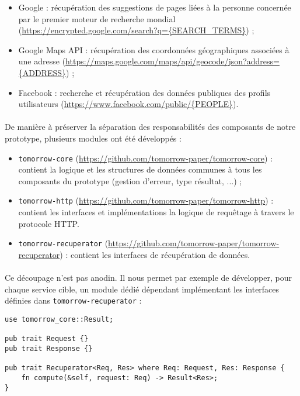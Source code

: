 \begin{itemize}
    \item Google : récupération des suggestions de pages liées à la personne concernée par le
    premier moteur de recherche mondial (\url{https://encrypted.google.com/search?q={SEARCH_TERMS}}) ;
    \item Google Maps API : récupération des coordonnées géographiques associées à une adresse
    (\url{https://maps.google.com/maps/api/geocode/json?address={ADDRESS}}) ;
    \item Facebook : recherche et récupération des données publiques des profils utilisateurs
    (\url{https://www.facebook.com/public/{PEOPLE}}).
\end{itemize}

\paragraph{} De manière à préserver la séparation des responsabilités des composants de notre prototype, plusieurs modules
ont été développés : 

\begin{itemize}
    \item \lstinline{tomorrow-core} (\url{https://github.com/tomorrow-paper/tomorrow-core}) : contient la logique et les
    structures de données communes à tous les composants du prototype (gestion d'erreur, type résultat, ...) ;
    \item \lstinline{tomorrow-http} (\url{https://github.com/tomorrow-paper/tomorrow-http}) : contient les interfaces et
    implémentations la logique de requêtage à travers le protocole HTTP.
    \item \lstinline{tomorrow-recuperator} (\url{https://github.com/tomorrow-paper/tomorrow-recuperator}) : contient les interfaces
    de récupération de données.
\end{itemize}

\paragraph{} Ce découpage n'est pas anodin. Il nous permet par exemple de développer, pour chaque service cible, un module
dédié dépendant implémentant les interfaces définies dans \lstinline{tomorrow-recuperator}  :

\begin{lstlisting}
use tomorrow_core::Result;

pub trait Request {}
pub trait Response {}

pub trait Recuperator<Req, Res> where Req: Request, Res: Response {
    fn compute(&self, request: Req) -> Result<Res>;
}\end{lstlisting}


